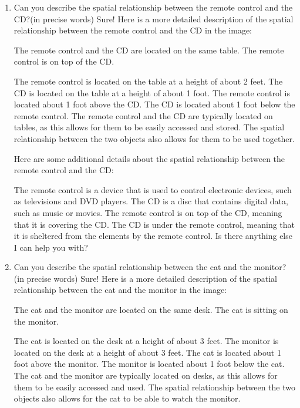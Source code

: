 \begin{enumerate}
    \item Can you describe the spatial relationship between the remote control and the CD?(in precise words)
    \subitem 
    Sure! Here is a more detailed description of the spatial relationship between the remote control and the CD in the image:
    
    The remote control and the CD are located on the same table. The remote control is on top of the CD.
    
    The remote control is located on the table at a height of about 2 feet.
    The CD is located on the table at a height of about 1 foot.
    The remote control is located about 1 foot above the CD.
    The CD is located about 1 foot below the remote control.
    The remote control and the CD are typically located on tables, as this allows for them to be easily accessed and stored. The spatial relationship between the two objects also allows for them to be used together.
    
    Here are some additional details about the spatial relationship between the remote control and the CD:
    
    The remote control is a device that is used to control electronic devices, such as televisions and DVD players.
    The CD is a disc that contains digital data, such as music or movies.
    The remote control is on top of the CD, meaning that it is covering the CD.
    The CD is under the remote control, meaning that it is sheltered from the elements by the remote control.
    Is there anything else I can help you with?
    \item Can you describe the spatial relationship between the cat and the monitor?(in precise words)
    \subitem 
    Sure! Here is a more detailed description of the spatial relationship between the cat and the monitor in the image:
    
    The cat and the monitor are located on the same desk. The cat is sitting on the monitor.
    
    The cat is located on the desk at a height of about 3 feet.
    The monitor is located on the desk at a height of about 3 feet.
    The cat is located about 1 foot above the monitor.
    The monitor is located about 1 foot below the cat.
    The cat and the monitor are typically located on desks, as this allows for them to be easily accessed and used. The spatial relationship between the two objects also allows for the cat to be able to watch the monitor.
    

\end{enumerate}
